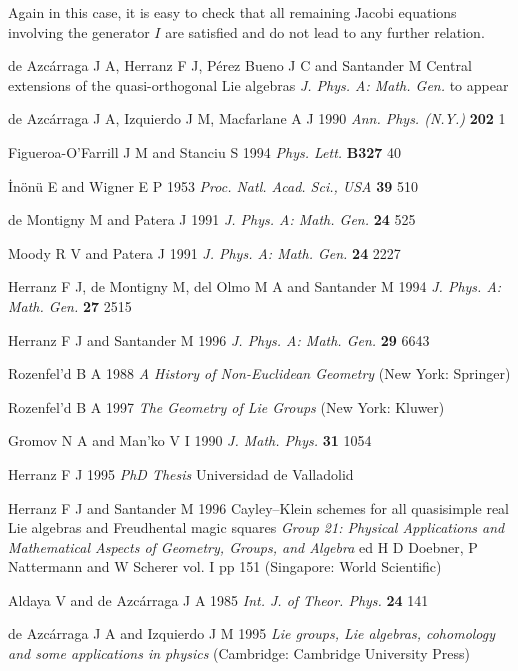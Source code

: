 \documentclass[12pt]{article}
\begin{document}
Again in this case, it is easy to check that all  remaining Jacobi
equations involving the generator ${I}$ are satisfied and  do not lead
to any further relation.

\begin{thebibliography}{30}

de Azc\'arraga J A,   Herranz F J,   P\'erez Bueno J C  and
Santander M  {Central extensions of the quasi-orthogonal Lie algebras}
{\em J. Phys. A: Math. Gen.} to appear

de Azc\'arraga J A, Izquierdo J M, Macfarlane A J 1990
{\em Ann. Phys. (N.Y.)} {\bf 202} 1

Figueroa-O'Farrill J M and Stanciu S 1994 {\em Phys. Lett.} {\bf B327} 40

\.In\"on\"u  E  and   Wigner E P 1953 {\em Proc. Natl.
Acad. Sci., USA}  {\bf 39}  510

   de Montigny M  and     Patera J 1991
{\em J. Phys. A: Math. Gen.} {\bf 24}   525

 Moody  R V  and    Patera J 1991
{\em J. Phys. A: Math. Gen.}  {\bf 24}  2227

  Herranz F J,   de Montigny M,   del Olmo M A   and   Santander M
1994 {\em J. Phys. A: Math. Gen.}  {\bf 27}  2515

  Herranz F J and   Santander M 1996
{\em J. Phys. A: Math. Gen.}  {\bf 29} 6643

    Rozenfel'd B A 1988
{\em A History of Non-Euclidean Geometry} (New York: Springer)

    Rozenfel'd B A 1997
{\em The Geometry of Lie Groups} (New York: Kluwer)

  Gromov N A and   Man'ko V I 1990 {\em J. Math. Phys.} {\bf 31}  1054

  Herranz F J 1995 {\em PhD Thesis}  Universidad de Valladolid

  Herranz F J and  Santander M 1996
{Cayley--Klein  schemes for all quasisimple real Lie algebras
  and Freudhental magic squares}
{\em Group  21: Physical Applications and Mathematical Aspects of Geometry,
Groups, and  Algebra} ed  H D  Doebner, P Nattermann  and W Scherer
  vol. I  pp 151  (Singapore: World Scientific)

 Aldaya V and   de Azc\'arraga J A 1985
{\em Int. J. of Theor. Phys.} {\bf 24}  141

  de Azc\'arraga J A and  Izquierdo J M 1995
{\em Lie groups, Lie algebras, cohomology and some applications in
  physics}   (Cambridge: Cambridge  University Press)

\end{thebibliography}
\end{document}
